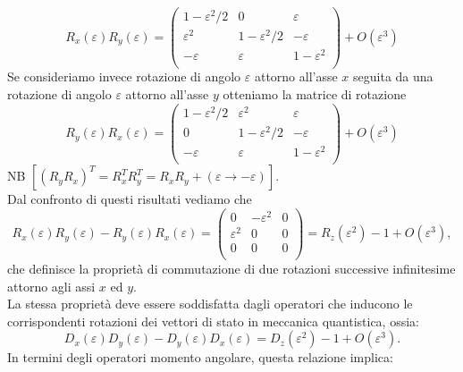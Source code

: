 \begin{equation}
R_x (\varepsilon)R_y (\varepsilon)=
\begin{pmatrix}
1-\varepsilon ^2/2 & 0 & \varepsilon \\
 \varepsilon ^2 & 1-\varepsilon ^2/2 & -\varepsilon \\
-  \varepsilon & \varepsilon & 1-\varepsilon ^2 \\
\end{pmatrix}
+ O(\varepsilon ^3)
\end{equation}
Se consideriamo invece rotazione di angolo $\varepsilon$ attorno all'asse $x$ seguita da una rotazione di angolo $\varepsilon$ attorno all'asse $y$ otteniamo la matrice di rotazione
\begin{equation}
R_y (\varepsilon)R_x (\varepsilon)=
\begin{pmatrix}
1-\varepsilon ^2/2 & \varepsilon ^2 & \varepsilon \\
 0 & 1-\varepsilon ^2/2 & -\varepsilon \\
-  \varepsilon & \varepsilon & 1-\varepsilon ^2 \\
\end{pmatrix}
+ O(\varepsilon ^3)
\end{equation}
NB $\displaystyle{\left[\left( R_y R_x\right) ^T = R_x ^T R_y ^T=R_xR_y+(\varepsilon\rightarrow -\varepsilon)\right]}$.\\
Dal confronto di questi risultati vediamo che
\begin{equation}
R_x (\varepsilon)R_y (\varepsilon)-R_y (\varepsilon)R_x (\varepsilon)=
\begin{pmatrix}
0 & - \varepsilon ^2 & 0 \\
 \varepsilon ^2 & 0 & 0 \\
0 & 0& 0\\
\end{pmatrix}
= R_z(\varepsilon ^2)-1+ O(\varepsilon ^3),
\end{equation}
che definisce la proprietà di commutazione di due rotazioni successive infinitesime attorno agli assi $x$ ed $y$.\\
La stessa proprietà deve essere soddisfatta dagli operatori che inducono le corrispondenti rotazioni dei vettori di stato in meccanica quantistica, ossia:
\begin{equation}
D_x (\varepsilon)D_y (\varepsilon)-D_y (\varepsilon)D_x (\varepsilon)=D_z(\varepsilon ^2)-1+ O(\varepsilon ^3).
\end{equation}
In termini degli operatori momento angolare, questa relazione implica:
